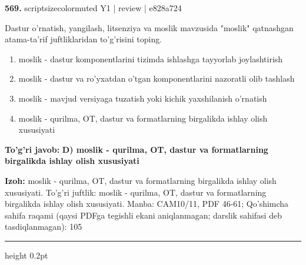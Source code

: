 \documentclass[10pt,a4paper]{article}
\begin{document}
{\bfseries\sffamily\color{ink} 569.} {scriptsizecolor{muted} Y1 | review | e828a724}
\par
Dastur o'rnatish, yangilash, litsenziya va moslik mavzusida "moslik" qatnashgan atama-ta'rif juftliklaridan to'g'risini toping.
\begin{enumerate}[label=\Alph*),leftmargin=9mm]
\item moslik - dastur komponentlarini tizimda ishlashga tayyorlab joylashtirish
\item moslik - dastur va ro'yxatdan o'tgan komponentlarini nazoratli olib tashlash
\item moslik - mavjud versiyaga tuzatish yoki kichik yaxshilanish o'rnatish
\item moslik - qurilma, OT, dastur va formatlarning birgalikda ishlay olish xususiyati
\end{enumerate}
\begin{tcolorbox}[enhanced,breakable,colback=teal!4,colframe=teal!60!black,boxrule=0.45pt,arc=1.2mm,left=2.7mm,right=2.7mm,top=1.8mm,bottom=1.8mm,before skip=2mm,after skip=2mm]
{\bfseries\sffamily\color{teal}To'g'ri javob:} \textbf{D) moslik - qurilma, OT, dastur va formatlarning birgalikda ishlay olish xususiyati}
\par\smallskip
{\bfseries Izoh:} moslik - qurilma, OT, dastur va formatlarning birgalikda ishlay olish xususiyati. To'g'ri juftlik: moslik - qurilma, OT, dastur va formatlarning birgalikda ishlay olish xususiyati. Manba: CAM10/11, PDF 46-61; Qo'shimcha sahifa raqami (qaysi PDFga tegishli ekani aniqlanmagan; darslik sahifasi deb tasdiqlanmagan): 105
\end{tcolorbox}
\vspace{2mm}\hrule height 0.2pt\vspace{3mm}
\end{document}
